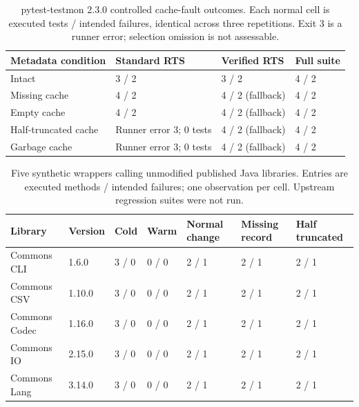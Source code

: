 \begin{table}[t]
\centering
\small
\caption{pytest-testmon 2.3.0 controlled cache-fault outcomes. Each normal cell is executed tests / intended failures, identical across three repetitions. Exit 3 is a runner error; selection omission is not assessable.}
\label{tab:testmon-faults}
\begin{tabular}{llll}
\toprule
Metadata condition & Standard RTS & Verified RTS & Full suite \\
\midrule
Intact & 3 / 2 & 3 / 2 & 4 / 2 \\
Missing cache & 4 / 2 & 4 / 2 (fallback) & 4 / 2 \\
Empty cache & 4 / 2 & 4 / 2 (fallback) & 4 / 2 \\
Half-truncated cache & Runner error 3; 0 tests & 4 / 2 (fallback) & 4 / 2 \\
Garbage cache & Runner error 3; 0 tests & 4 / 2 (fallback) & 4 / 2 \\
\bottomrule
\end{tabular}
\end{table}
\begin{table}[t]
\centering
\small
\caption{Five synthetic wrappers calling unmodified published Java libraries. Entries are executed methods / intended failures; one observation per cell. Upstream regression suites were not run.}
\label{tab:wrapper-pilot}
\begin{tabular}{lllllll}
\toprule
Library & Version & Cold & Warm & Normal change & Missing record & Half truncated \\
\midrule
Commons CLI & 1.6.0 & 3 / 0 & 0 / 0 & 2 / 1 & 2 / 1 & 2 / 1 \\
Commons CSV & 1.10.0 & 3 / 0 & 0 / 0 & 2 / 1 & 2 / 1 & 2 / 1 \\
Commons Codec & 1.16.0 & 3 / 0 & 0 / 0 & 2 / 1 & 2 / 1 & 2 / 1 \\
Commons IO & 2.15.0 & 3 / 0 & 0 / 0 & 2 / 1 & 2 / 1 & 2 / 1 \\
Commons Lang & 3.14.0 & 3 / 0 & 0 / 0 & 2 / 1 & 2 / 1 & 2 / 1 \\
\bottomrule
\end{tabular}
\end{table}
